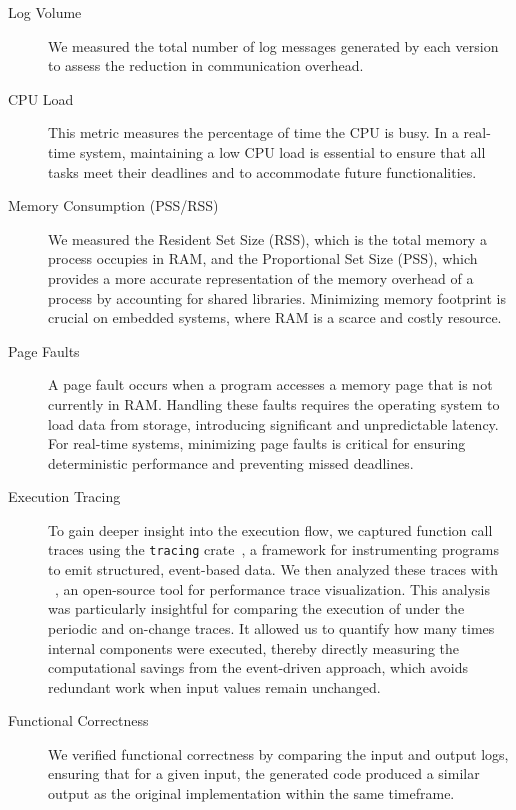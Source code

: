 \begin{description}
    \item[Log Volume] We measured the total number of log messages generated by each version to
          assess the reduction in communication overhead.

    \item[CPU Load] This metric measures the percentage of time the CPU is busy. In a real-time
          system, maintaining a low CPU load is essential to ensure that all tasks meet their
          deadlines and to accommodate future functionalities.

    \item[Memory Consumption (PSS/RSS)] We measured the Resident Set Size (RSS), which is the total
          memory a process occupies in RAM, and the Proportional Set Size (PSS), which provides a
          more accurate representation of the memory overhead of a process by accounting for shared
          libraries. Minimizing memory footprint is crucial on embedded systems, where RAM is a
          scarce and costly resource.

    \item[Page Faults] A page fault occurs when a program accesses a memory page that is not
          currently in RAM. Handling these faults requires the operating system to load data from
          storage, introducing significant and unpredictable latency. For real-time systems,
          minimizing page faults is critical for ensuring deterministic performance and preventing
          missed deadlines.

    \item[Execution Tracing] To gain deeper insight into the execution flow, we captured function
          call traces using the \texttt{tracing} crate~\cite{tracing_rust}, a framework for
          instrumenting \Rust programs to emit structured, event-based data. We then analyzed these
          traces with \perfetto~\cite{perfetto}, an open-source tool for performance trace
          visualization. This analysis was particularly insightful for comparing the execution of
          \disgrust under the periodic and on-change traces. It allowed us to quantify how many
          times internal components were executed, thereby directly measuring the computational
          savings from the event-driven approach, which avoids redundant work when input values
          remain unchanged.

    \item[Functional Correctness] We verified functional correctness by comparing the input and
          output logs, ensuring that for a given input, the generated code produced a similar output
          as the original implementation within the same timeframe.
\end{description}

